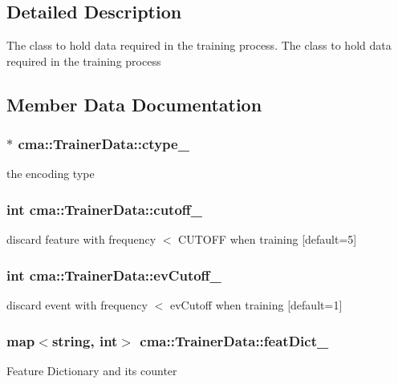 \subsection{Detailed Description}
The class to hold data required in the training process. The class to hold data required in the training process 

\subsection{Member Data Documentation}
\subsubsection[{ctype\_\-}]{$\ast$ {\bf cma::TrainerData::ctype\_\-}}\label{classcma_1_1TrainerData_aa415bd191302d39887f15f1511392ab3}
the encoding type 
\subsubsection[{cutoff\_\-}]{\setlength{\rightskip}{0pt plus 5cm}int {\bf cma::TrainerData::cutoff\_\-}}\label{classcma_1_1TrainerData_a23c70e451c8ba9cf53e2eccec8fc421d}
discard feature with frequency $<$ CUTOFF when training [default=5] 
\subsubsection[{evCutoff\_\-}]{\setlength{\rightskip}{0pt plus 5cm}int {\bf cma::TrainerData::evCutoff\_\-}}\label{classcma_1_1TrainerData_a22eca27d2b88fc89251ed74fa9b1a255}
discard event with frequency $<$ evCutoff when training [default=1] 
\subsubsection[{featDict\_\-}]{\setlength{\rightskip}{0pt plus 5cm}map$<$string, int$>$ {\bf cma::TrainerData::featDict\_\-}}\label{classcma_1_1TrainerData_a565db4b9101b4c17c9a6f8530a19d2f6}
Feature Dictionary and its counter 

